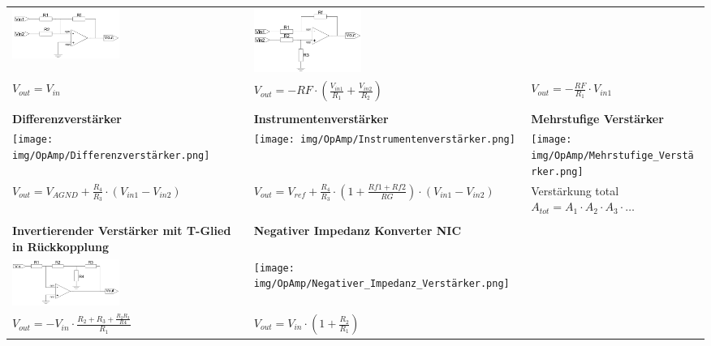 \documentclass[margin=normal]{tex/hsrzf}
\begin{document}
\begin{tabularx}{0.8\textwidth}{p{155pt}p{155pt}p{155pt}}
  \includegraphics[width = 3.5cm]{img/OpAmp/Invertierender_Addierer.png}                            &
  \includegraphics[width = 3.5cm]{img/OpAmp/Gewichteter_Subtrahierer.png}                             \\
  $ V_{out} = V_{in}$                                                                               &
  $ V_{out} = - RF \cdot (\frac{V_{in1}}{R_1} + \frac{V_{in2}}{R_2}) $                              &
  $ V_{out} =-\frac{RF}{R_1} \cdot V_{in1} $                                                          \\
  \\
  \textbf{Differenzverstärker}                                                                      &
  \textbf{Instrumentenverstärker}                                                                   &
  \textbf{Mehrstufige Verstärker}                                                                     \\
  \texttt{[image: img/OpAmp/Differenzverstärker.png]}                                &
  \texttt{[image: img/OpAmp/Instrumentenverstärker.png]}                             &
  \texttt{[image: img/OpAmp/Mehrstufige\_Verstärker.png]}                               \\
  $ V_{out} = V_{AGND} + \frac{R_4}{R_3} \cdot(V_{in1} - V_{in2}) $                                 &
  $ V_{out} = V_{ref} + \frac{R_4}{R_3} \cdot (1 + \frac{Rf1 + Rf2}{RG}) \cdot (V_{in1} - V_{in2})$ &
  Verstärkung total $ A_{tot} = A_1 \cdot A_2 \cdot A_3\cdot\dots$                                    \\
  \\
  \textbf{Invertierender Verstärker \newline
  mit T-Glied in Rückkopplung}                                                                      &
  \textbf{Negativer Impedanz Konverter NIC}                                                           \\
  \includegraphics[width = 3.5cm]{img/OpAmp/Invertierender_Verstärker_mit_T-Glied_Rückkopplung.png} &
  \texttt{[image: img/OpAmp/Negativer\_Impedanz\_Verstärker.png]}                        \\
  $ V_{out} = - V_{in} \cdot \frac{R_2 + R_3 + \frac{R_2R_3}{R4}}{R_1} $                            &
  $ V_{out} = V_{in} \cdot (1+ \frac{R_2}{R_1})$                                                    &
  \\
\end{tabularx}
\endgroup
\end{document}
